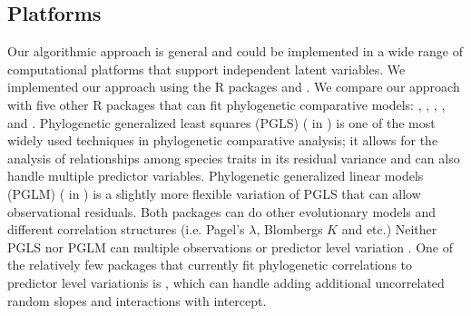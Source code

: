 \subsection{Platforms}

Our algorithmic approach is general and could be implemented in a wide range of computational platforms that support independent latent variables. We implemented our approach using the R packages  \citep{bates2015fitting} and  .
We compare our approach with five other R packages that can fit phylogenetic comparative models:  \citep{pinheiro2014r},  \citep{ho2014phylolm},  \citep{pearse2015pez},  \cite{hadfield2010mcmc}, and  \citep{burkner2016brms}.
Phylogenetic generalized least squares (PGLS) ( in ) is one of the most widely used techniques in phylogenetic comparative analysis; it allows for the analysis of relationships among species traits in its residual variance and can also handle multiple predictor variables.
Phylogenetic generalized linear models (PGLM) ( in ) is a slightly more flexible variation of PGLS that can allow observational residuals.
Both packages can do other evolutionary models and different correlation structures (i.e. Pagel's $\lambda$, Blombergs $K$ and etc.)
Neither PGLS nor PGLM can multiple observations or predictor level variation . 
One of the relatively few packages that currently fit phylogenetic correlations to predictor level variationis is , which can handle adding additional uncorrelated random slopes and interactions with intercept.

  


